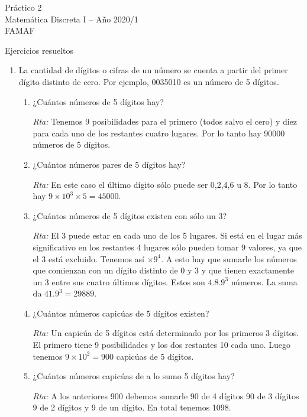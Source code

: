 \documentclass[12pt,spanish,makeidx]{amsbook}
\begin{document}
	
{\bf \begin{center} Práctico 2 \\ Matemática Discreta I -- Año 2020/1 \\ FAMAF \end{center}}

{\bf \begin{center} Ejercicios resueltos \end{center}}

\begin{enumerate}
\item  La cantidad de dígitos o cifras de un número se cuenta a partir del primer dígito
distinto de cero. Por ejemplo, 0035010 es un número de 5 dígitos.
\begin{enumerate}
\item ¿Cuántos números de 5 dígitos hay?

\textit{Rta:} Tenemos 9 posibilidades para el primero (todos salvo el cero) y diez para cada uno de los restantes cuatro lugares. Por lo tanto hay 90000 números de 5 dígitos.

\item ¿Cuántos números pares de 5 dígitos hay?

\textit{Rta:} En este caso el último dígito sólo puede ser 0,2,4,6 u 8. Por lo tanto hay $9\times 10^3\times 5= 45000$.

\item ¿Cuántos números de 5 dígitos existen con sólo un 3?

\noindent\textit{Rta:} El 3 puede estar en cada uno de los 5 lugares. Si está en el lugar más significativo en los restantes 4 lugares sólo pueden tomar 9 valores, ya que el 3 está excluido. Tenemos así $\times 9^4.$ A esto hay que sumarle los números que comienzan con un dígito distinto de 0 y 3 y que tienen exactamente un 3 entre sus cuatro últimos dígitos. Estos son $4.8.9^3$ números. La suma da $41.9^3=29889$.

\item ¿Cuántos números capicúas de 5 dígitos existen?

\textit{Rta:} Un capicúa de 5 dígitos está determinado por los primeros 3 dígitos. El primero tiene 9 posibilidades y los dos restantes 10 cada uno. Luego tenemos $9\times 10^2=900 $ capicúas de 5 dígitos.

\item ¿Cuántos números capicúas de a lo sumo 5 dígitos hay?

\textit{Rta:} A los anteriores 900 debemos sumarle 90 de 4 dígitos 90 de 3 dígitos 9 de 2 dígitos y 9 de un dígito. En total tenemos 1098.
 

\end{enumerate}
\end{enumerate}
\end{document}
